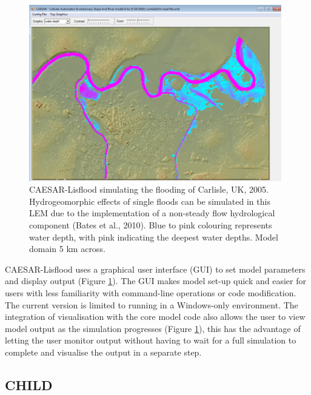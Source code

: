 \begin{figure}[t]
\includegraphics[width=11cm]{LEMFinalRevisedmanuscriptDAVFinalrevisions-img/LEMFinalRevisedmanuscriptDAVFinalrevisions-img007.png} 
\caption{CAESAR-Lisflood simulating the flooding of Carlisle, UK, 2005. Hydrogeomorphic effects of single floods can be simulated in this LEM due to the implementation of a non-steady flow hydrological component (Bates et al., 2010). Blue to pink colouring represents water depth, with pink indicating the deepest water depths. Model domain 5 km across.}
\label{fig_LEM_CAEASR_Lisflood}
\end{figure}

CAESAR-Lisflood uses a graphical user interface (GUI) to set model parameters and display output (Figure \ref{fig_LEM_CAEASR_Lisflood}). The GUI makes model set-up quick and easier for users with less familiarity with command-line operations or code modification. The current version is limited to running in a Windows-only environment. The integration of visualisation with the core model code also allows the user to view model output as the simulation progresses (Figure \ref{fig_LEM_CAEASR_Lisflood}), this has the advantage of letting the user monitor output without having to wait for a full simulation to complete and visualise the output in a separate step. 

\subsection{CHILD}

